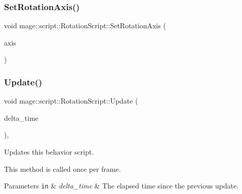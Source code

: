 \hypertarget{classmage_1_1script_1_1_rotation_script_aa4b49dc5e34da3e851d5aefc4c4a434b}{}\label{classmage_1_1script_1_1_rotation_script_aa4b49dc5e34da3e851d5aefc4c4a434b} 
\subsubsection{\texorpdfstring{Set\+Rotation\+Axis()}{SetRotationAxis()}}
{\footnotesize\ttfamily void mage\+::script\+::\+Rotation\+Script\+::\+Set\+Rotation\+Axis (\begin{DoxyParamCaption}\item[{\hyperlink{classmage_1_1script_1_1_rotation_script_aa8a91cc8c771fc777ffb5e8a28c43ad2}{Rotation\+Axis}}]{axis }\end{DoxyParamCaption})\hspace{0.3cm}{\ttfamily [noexcept]}}

\hypertarget{classmage_1_1script_1_1_rotation_script_a868768482599b478e8fd8afe371b6c54}{}\label{classmage_1_1script_1_1_rotation_script_a868768482599b478e8fd8afe371b6c54} 
\subsubsection{\texorpdfstring{Update()}{Update()}}
{\footnotesize\ttfamily void mage\+::script\+::\+Rotation\+Script\+::\+Update (\begin{DoxyParamCaption}\item[{\mbox{[}\mbox{[}maybe\+\_\+unused\mbox{]} \mbox{]} \hyperlink{namespacemage_ad26233bbec640deda836e572c1a23708}{F64}}]{delta\+\_\+time }\end{DoxyParamCaption})\hspace{0.3cm}{\ttfamily [override]}, {\ttfamily [virtual]}}

Updates this behavior script.

This method is called once per frame.


\begin{DoxyParams}[1]{Parameters}
\mbox{\tt in}  & {\em delta\+\_\+time} & The elapsed time since the previous update. \\
\hline
\end{DoxyParams}

